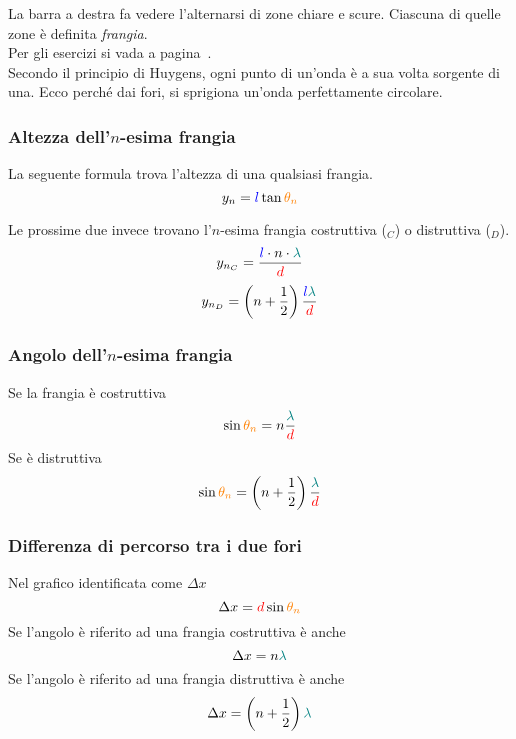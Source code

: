 La barra a destra fa vedere l'alternarsi di zone chiare e scure. Ciascuna di quelle zone è definita
\emph{frangia}.\\
Per gli esercizi si vada a pagina~\pageref{ex:young}.\\ [\baselineskip]
Secondo il principio di Huygens, ogni punto di un'onda è a sua volta sorgente di una. Ecco perché
dai fori, si sprigiona un'onda perfettamente circolare.

\subsubsection{Altezza dell'$n$-esima frangia}
La seguente formula trova l'altezza di una qualsiasi frangia.
\begin{equation*}
  y_n = \mathcolor{blue}{l}\tan\mathcolor{orange}{\theta_n}
\end{equation*}

Le prossime due invece trovano l'$n$-esima frangia costruttiva ($_C$) o distruttiva ($_D$).
\begin{equation*}
  y_{n_C} = \frac{\mathcolor{blue}{l}\cdot n\cdot\mathcolor{teal}{\lambda}}{\mathcolor{red}{d}}
\end{equation*}
\begin{equation*}
  y_{n_D} =
  \left(n+\frac{1}{2}\right)\frac{\mathcolor{blue}{l}\mathcolor{teal}{\lambda}}{\mathcolor{red}{d}}
\end{equation*}

\subsubsection{Angolo dell'$n$-esima frangia}
Se la frangia è costruttiva
\begin{equation*}
  \sin\mathcolor{orange}{\theta_n} = n\frac{\mathcolor{teal}{\lambda}}{\mathcolor{red}{d}}
\end{equation*}
Se è distruttiva
\begin{equation*}
  \sin\mathcolor{orange}{\theta_n} =
  \left(n+\frac{1}{2}\right)\frac{\mathcolor{teal}{\lambda}}{\mathcolor{red}{d}}
\end{equation*}

\subsubsection{Differenza di percorso tra i due fori}
Nel grafico identificata come $\Delta x$
\begin{equation*}
  \Delta x = \mathcolor{red}{d}\sin\mathcolor{orange}{\theta_n}
\end{equation*}
Se l'angolo è riferito ad una frangia costruttiva è anche
\begin{equation*}
  \Delta x = n\mathcolor{teal}{\lambda}
\end{equation*}
Se l'angolo è riferito ad una frangia distruttiva è anche
\begin{equation*}
  \Delta x = \left(n+\frac{1}{2}\right)\mathcolor{teal}{\lambda}
\end{equation*}

